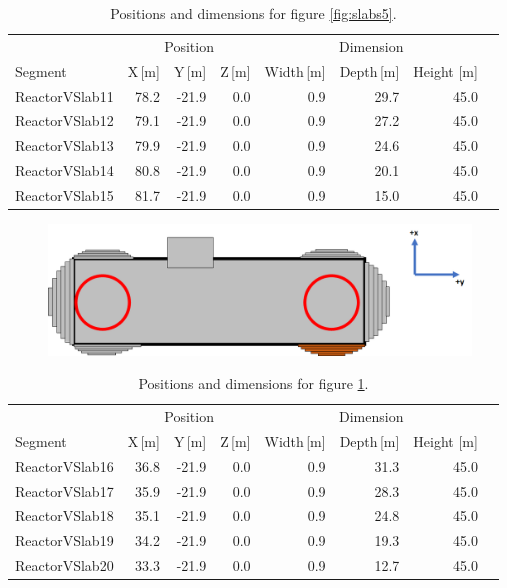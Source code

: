 \begin{table}[!h]
\centering
\begin{tabular}{lrrrrrrr}  
\toprule
\multicolumn{1}{c}{} & \multicolumn{3}{c}{Position} & \multicolumn{3}{c}{Dimension} \\
\cmidrule(r){2-4}
\cmidrule(r){5-7}
Segment        & X\,[m] & Y\,[m] & Z\,[m] & Width\,[m] & Depth\,[m] & Height [m]\\
\midrule
ReactorVSlab11 & 78.2   & -21.9  & 0.0    & 0.9        & 29.7       & 45.0\\
ReactorVSlab12 & 79.1   & -21.9  & 0.0    & 0.9        & 27.2       & 45.0\\
ReactorVSlab13 & 79.9   & -21.9  & 0.0    & 0.9        & 24.6       & 45.0\\
ReactorVSlab14 & 80.8   & -21.9  & 0.0    & 0.9        & 20.1       & 45.0\\
ReactorVSlab15 & 81.7   & -21.9  & 0.0    & 0.9        & 15.0       & 45.0\\
\bottomrule  
\end{tabular}
\caption{Positions and dimensions for figure \ref{fig:slabs5}.}
\label{tab:slabs5}
\end{table}

\begin{figure}[!h]
 \centering
 \includegraphics[width=\linewidth]{Chapter5/Figs/wylfaRasterNew/Slabs6.png}
 \label{fig:slabs6}
\end{figure}

\begin{table}[!h]
\centering
\begin{tabular}{lrrrrrrr}  
\toprule
\multicolumn{1}{c}{} & \multicolumn{3}{c}{Position} & \multicolumn{3}{c}{Dimension} \\
\cmidrule(r){2-4}
\cmidrule(r){5-7}
Segment        & X\,[m] & Y\,[m] & Z\,[m] & Width\,[m] & Depth\,[m] & Height [m]\\
\midrule
ReactorVSlab16 & 36.8   & -21.9  & 0.0    & 0.9        & 31.3       & 45.0\\
ReactorVSlab17 & 35.9   & -21.9  & 0.0    & 0.9        & 28.3       & 45.0\\
ReactorVSlab18 & 35.1   & -21.9  & 0.0    & 0.9        & 24.8       & 45.0\\
ReactorVSlab19 & 34.2   & -21.9  & 0.0    & 0.9        & 19.3       & 45.0\\
ReactorVSlab20 & 33.3   & -21.9  & 0.0    & 0.9        & 12.7       & 45.0\\
\bottomrule  
\end{tabular}
\caption{Positions and dimensions for figure \ref{fig:slabs6}.}
\label{tab:slabs6}
\end{table}